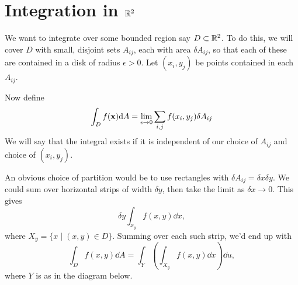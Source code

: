 \documentclass[a4paper]{scrreprt}
\begin{document}
\section{Integration in $\mathbb{R}^2$}

We want to integrate over some bounded region say $D \subset \mathbb{R}^2$. To do this, we will cover $D$ with small, disjoint sets $A_{ij}$, each with area $\delta A_{ij}$, so that each of these are contained in a disk of radius $\epsilon > 0$.
Let $(x_i, y_j)$ be points contained in each $A_{ij}$.

Now define
$$
	\int_D f(\mathbf{x}) \mathrm{d} A = \lim_{\epsilon \to 0} \sum_{i,j} f(x_i, y_j) \delta A_{ij}
$$
We will say that the integral exists if it is independent of our choice of $A_{ij}$ and choice of $(x_i, y_j)$.

An obvious choice of partition would be to use rectangles with $\delta A_{ij} = \delta x \delta y$. We could sum over horizontal strips of width $\delta y$, then take the limit as $\delta x \rightarrow 0$. This gives
$$
	\delta y \int_{x_y} f(x, y) \dd x,
$$
where $X_y = \{x \mid (x, y) \in D \}$. Summing over each such strip, we'd end up with
$$
\int_{D} f(x, y) \dd A = \int_Y \left(\int_{X_y} f(x, y) \dd x\right) \dd u,
$$
where $Y$ is as in the diagram below.
\end{document}
